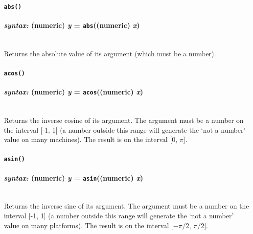 \documentclass{article}
\begin{document}

\paragraph{\texttt{abs()}\\\\
\normalfont \emph{syntax: } (numeric) \emph{y} = \texttt{abs}((numeric) \emph{x})\\\\}

Returns the absolute value of its argument (which must be a number).\\





\paragraph{\texttt{acos()}\\\\
\normalfont \emph{syntax: } (numeric) \emph{y} = \texttt{acos}((numeric) \emph{x})\\\\}

Returns the inverse cosine of its argument.  The argument must be a number on the interval [-1, 1] (a number outside this range will generate the `not a number' value on many machines).  The result is on the interval [0, $\pi$].\\





\paragraph{\texttt{asin()}\\\\
\normalfont \emph{syntax: } (numeric) \emph{y} = \texttt{asin}((numeric) \emph{x})\\\\}

Returns the inverse sine of its argument.  The argument must be a number on the interval [-1, 1] (a number outside this range will generate the `not a number' value on many platforms).  The result is on the interval [$-\pi/2$, $\pi/2$].\\
\end{document}
